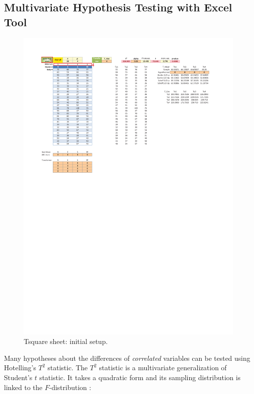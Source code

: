 \documentclass[article]{jss}
\begin{document}
        \subsection[egOneSample]{Multivariate Hypothesis Testing with Excel Tool}
        \begin{figure}[!tbh]      
        	\includegraphics[width=\linewidth, keepaspectratio=true]{img/TsquareSheetAfterPaste_markup}
        	\vspace{-25pt}\centering{}\protect\caption{Tsquare sheet: initial setup.}\label{fig:corkboringinitialsetup}
        \end{figure}
        
        
        Many hypotheses about the differences of \emph{correlated} variables can be tested using Hotelling's $T^2$ statistic. The $T^2$ statistic is a multivariate generalization of Student's $t$ statistic. It takes a quadratic form and its sampling distribution is linked to the $F$-distribution \citep{hotelling1931Tsq}:
        
\end{document}
